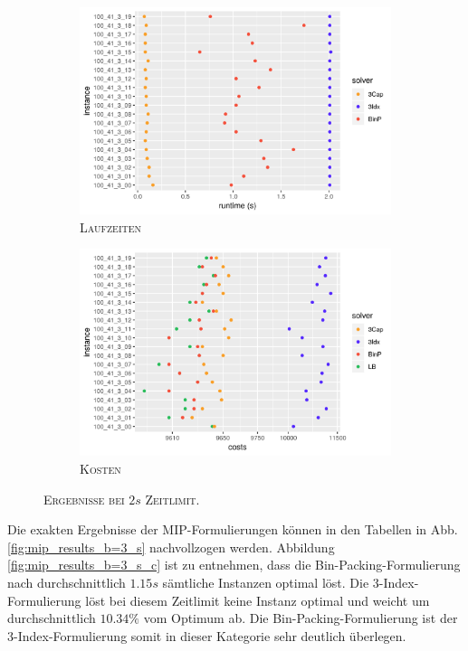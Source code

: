 \begin{figure}[H]
\centering
\begin{subfigure}[b]{0.4\textwidth}
\centering
\includegraphics[width=1.3\textwidth]{img/solver_instance_time_b=3_s_2s.png}
\caption{\textsc{Laufzeiten}}
\label{fig:b=3_s_runtimes}
\end{subfigure}
\hfill
\begin{subfigure}[b]{0.4\textwidth}
\centering
\includegraphics[width=1.3\textwidth]{img/solver_instance_cost_b=3_s_2s.png}
\caption{\textsc{Kosten}}
\label{fig:b=3_s_costs}
\end{subfigure}
\caption{\textsc{Ergebnisse bei $2s$ Zeitlimit}.}
\end{figure}

Die exakten Ergebnisse der MIP-Formulierungen können in den Tabellen in Abb. \ref{fig:mip_results_b=3_s} nachvollzogen werden. Abbildung \ref{fig:mip_results_b=3_s_c} ist zu entnehmen, dass die Bin-Packing-Formulierung nach
durchschnittlich $1.15s$ sämtliche Instanzen optimal löst. Die 3-Index-Formulierung löst bei diesem Zeitlimit keine Instanz optimal und weicht um durchschnittlich $10.34 \%$ vom Optimum ab.
Die Bin-Packing-Formulierung ist der 3-Index-Formulierung somit in dieser Kategorie sehr deutlich überlegen.

